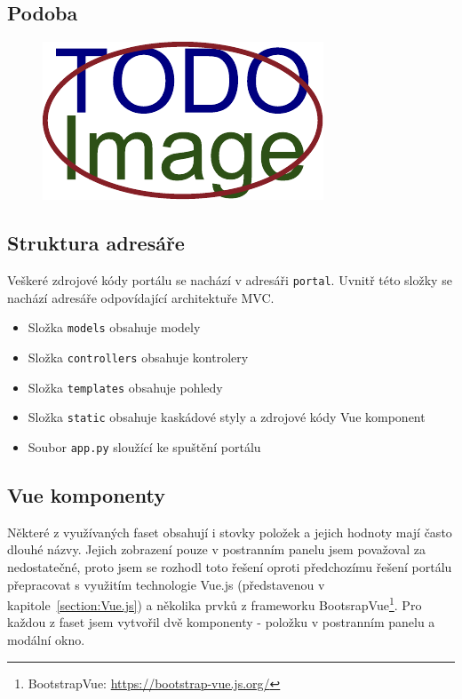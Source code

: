 \blindtext[2]

\subsection{Podoba}
\blindtext

\begin{figure}[H]
	\centering
	\includegraphics[width=\textwidth]{obrazky-figures/placeholder.pdf}
	\caption{\blindtext}
	\label{mvc}
\end{figure}

\blindtext[2]

\subsection{Struktura adresáře}
Veškeré zdrojové kódy portálu se nachází v adresáři \texttt{portal}. Uvnitř této složky se nachází adresáře odpovídající architektuře MVC.
\begin{itemize}
  \item Složka \texttt{models} obsahuje modely
  \item Složka \texttt{controllers} obsahuje kontrolery
  \item Složka \texttt{templates} obsahuje pohledy
  \item Složka \texttt{static} obsahuje kaskádové styly a zdrojové kódy Vue komponent
  \item Soubor \texttt{app.py} sloužící ke spuštění portálu
\end{itemize}

\subsection{Vue komponenty}
Některé z využívaných faset obsahují i stovky položek a jejich hodnoty mají často dlouhé názvy. Jejich zobrazení pouze v postranním panelu jsem považoval za nedostatečné, proto jsem se rozhodl toto řešení oproti předchozímu řešení portálu přepracovat s využitím technologie Vue.js (představenou v kapitole~\ref{section:Vue.js}) a několika prvků z frameworku BootsrapVue\footnote{BootstrapVue: \url{https://bootstrap-vue.js.org/}}. Pro každou z faset jsem vytvořil dvě komponenty - položku v postranním panelu a modální okno.

